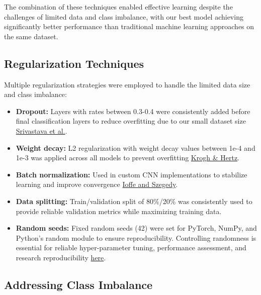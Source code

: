 \documentclass[a4paper,12pt]{article}
\begin{document}
The combination of these techniques enabled effective learning despite the challenges of limited data and class imbalance, with our best model achieving significantly better performance than traditional machine learning approaches on the same dataset.

\subsection{Regularization Techniques}

Multiple regularization strategies were employed to handle the limited data size and class imbalance:

\begin{itemize}
    \item \textbf{Dropout:} Layers with rates between 0.3-0.4 were consistently added before final classification layers to reduce overfitting due to our small dataset size \href{https://www.jmlr.org/papers/volume15/srivastava14a/srivastava14a.pdf}{Srivastava et al.}.
    
    \item \textbf{Weight decay:} L2 regularization with weight decay values between 1e-4 and 1e-3 was applied across all models to prevent overfitting \href{https://papers.nips.cc/paper/1991/file/8eefcfdf5990e441f0fb6f3fad709e21-Paper.pdf}{Krogh \& Hertz}.
    
    \item \textbf{Batch normalization:} Used in custom CNN implementations to stabilize learning and improve convergence \href{https://arxiv.org/abs/1502.03167}{Ioffe and Szegedy}.
    
    \item \textbf{Data splitting:} Train/validation split of 80\%/20\% was consistently used to provide reliable validation metrics while maximizing training data.
    
    \item \textbf{Random seeds:} Fixed random seeds (42) were set for PyTorch, NumPy, and Python's random module to ensure reproducibility. Controlling randomness is essential for reliable hyper-parameter tuning, performance assessment, and research reproducibility \href{https://ieeexplore.ieee.org/stamp/stamp.jsp?tp=&arnumber=10533638&tag=}{here}.
\end{itemize}

\subsection{Addressing Class Imbalance}
\end{document}
